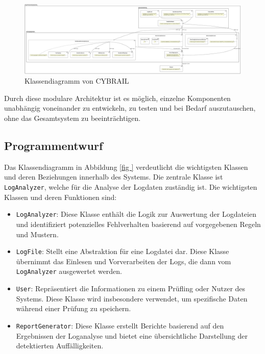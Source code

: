 \begin{landscape}
\begin{figure}[h]
    \centering
    \includegraphics[width=1.5\textwidth]{figures/CybrailArchitektur.pdf}
    \caption{Klassendiagramm von CYBRAIL}
        \label{fig:klassendiagramm}
\end{figure}
\end{landscape}

Durch diese modulare Architektur ist es möglich, einzelne Komponenten unabhängig voneinander zu entwickeln, zu testen und bei Bedarf auszutauschen, ohne das Gesamtsystem zu beeinträchtigen.

\subsection{Programmentwurf}

Das Klassendiagramm in Abbildung \ref{fig
} verdeutlicht die wichtigsten Klassen und deren Beziehungen innerhalb des Systems. 
Die zentrale Klasse ist \texttt{LogAnalyzer}, welche für die Analyse der Logdaten zuständig ist. 
Die wichtigsten Klassen und deren Funktionen sind:

\begin{itemize} 
\item \texttt{LogAnalyzer}: Diese Klasse enthält die Logik zur Auswertung der Logdateien und identifiziert potenzielles Fehlverhalten basierend auf vorgegebenen Regeln und Mustern. 
\item \texttt{LogFile}: Stellt eine Abstraktion für eine Logdatei dar.
Diese Klasse übernimmt das Einlesen und Vorverarbeiten der Logs, die dann vom \texttt{LogAnalyzer} ausgewertet werden. 
\item \texttt{User}: Repräsentiert die Informationen zu einem Prüfling oder Nutzer des Systems. 
Diese Klasse wird insbesondere verwendet, um spezifische Daten während einer Prüfung zu speichern. 
\item \texttt{ReportGenerator}: Diese Klasse erstellt Berichte basierend auf den Ergebnissen der Loganalyse und bietet eine übersichtliche Darstellung der detektierten Auffälligkeiten. 
\end{itemize}

